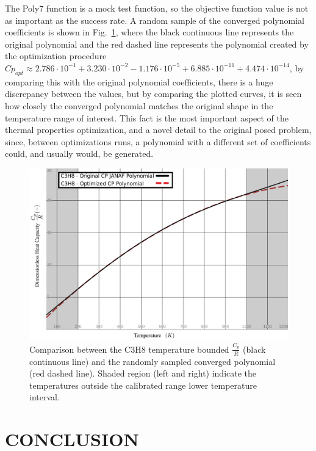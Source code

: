 \documentclass[10pt,fleqn,a4paper,twoside]{article}
\begin{document}
The Poly7 function is a mock test function, so the objective function value is not as important as the success rate.
A random sample of the converged polynomial coefficients is shown in Fig.~\ref{Fig:1}, where the black continuous line represents the original polynomial and the red dashed line
represents the polynomial created by the optimization procedure $Cp_{opt} \approx 2.786\cdot10^{-1} + 3.230\cdot10^{-2} -1.176\cdot10^{-5} + 6.885\cdot10^{-11} + 4.474\cdot10^{-14}$, by comparing 
this with the original polynomial coefficients, there is a huge discrepancy between the values, but by comparing the plotted curves, it is seen how closely the converged polynomial matches the 
original shape in the temperature range of interest. This fact is the most important aspect of the thermal properties optimization, and a novel detail to the original posed problem, since, between optimizations runs,
a polynomial with a different set of coefficients could, and usually would, be generated.

\begin{figure}[h!]
\centering
\includegraphics[angle=0, width=17cm]{C3H8.jpeg}
\caption{Comparison between the C3H8 temperature bounded $\frac{C_p}{R}$ (black continuous line) and the randomly sampled converged polynomial (red dashed line). Shaded region (left and right) indicate the temperatures outside the calibrated range lower temperature interval.}
\label{Fig:1}
\end{figure}

\section{CONCLUSION}
\end{document}
